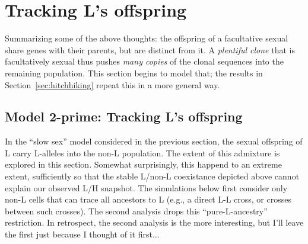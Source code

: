 \documentclass{article}\usepackage[]{graphicx}\usepackage[]{color}
\begin{document}
\section{Tracking L's offspring}
\label{sec:offspring}

Summarizing some of the above thoughts: the offspring of a facultative sexual share genes with their
parents, but are distinct from it.  A \emph{plentiful clone} that is facultatively sexual thus
pushes \emph{many copies} of the clonal sequences into the remaining population.  This section begins
to model that; the results in Section~\ref{sec:hitchhiking} repeat this in a more general way.

\subsection{Model 2-prime: Tracking L's offspring}
\label{sec:2prime}

In the ``slow sex'' model considered in the previous section, the sexual offspring of L carry
L-alleles into the non-L population.  The extent of this admixture is explored in this section.
Somewhat surprisingly, this happend to an extreme extent, sufficiently so that the stable L/non-L
coexistance depicted above cannot explain our observed L/H snapshot.  The simulations below first
consider only non-L cells that can trace all ancestors to L (e.g., a direct L-L cross, or crosses
between such crosses).  The second analysis drops this ``pure-L-ancestry'' restriction.  In
retrospect, the second analysis is the more interesting, but I'll leave the first just because I
thought of it first...
\end{document}
